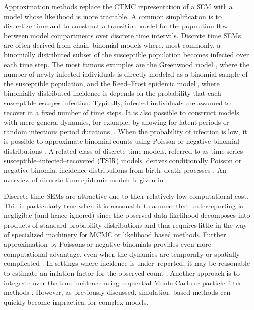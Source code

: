 Approximation methods replace the CTMC representation of a SEM with a model whose likelihood is more tractable. A common simplification is to discretize time and to construct a transition model for the population flow between model compartments over discrete time intervals. Discrete time SEMs are often derived from chain--binomial models where, most commonly, a binomially distributed subset of the susceptible population becomes infected over each time step. The most famous examples are the Greenwood model \cite{greenwood1931statistical}, where the number of newly infected individuals is directly modeled as a binomial sample of the susceptible population, and the Reed--Frost epidemic model \cite{abbey1952examination}, where binomially distributed incidence is depends on the probability that each susceptible escapes infection. Typically, infected individuals are assumed to recover in a fixed number of time steps. It is also possible to construct models with more general dynamics, for example, by allowing for latent periods or random infectious period durations, \cite{lekone2006}. When the probability of infection is low, it is possible to approximate binomial counts using Poisson or negative binomial distributions \cite{held2005,paul2011predictive}. A related class of discrete time models, referred to as time series susceptible--infected--recovered (TSIR) models, derives conditionally Poisson or negative binomial incidence distributions from birth--death processes \cite{bjornstad2002dynamics,finkenstadt2000time,finkenstadt2002stochastic,glass2003}. An overview of discrete time epidemic models is given in \cite{wakefield2017spatio}.

Discrete time SEMs are attractive due to their relatively low computational cost. This is particularly true when it is reasonable to assume that underreporting is negligible (and hence ignored) since the observed data likelihood decomposes into products of standard probability distributions and thus requires little in the way of specialized machinery for MCMC or likelihood based methods. Further approximation by Poissons or negative binomials provides even more computational advantage, even when the dynamics are temporally or spatially complicated   \cite{bauer2016bayesian,held2005,fisher2017time,meyer2017incorporating}. In settings where incidence is under--reported, it may be reasonable to estimate an inflation factor for the observed count \cite{finkenstadt2000time,wakefield2017spatio}. Another approach is to integrate over the true incidence using sequential Monte Carlo or particle filter methods \cite{dukic2012,ionides2006inference,ionides2011iterated,shubin2016revealing}. However, as previously discussed, simulation--based methods can quickly become impractical for complex models. 

